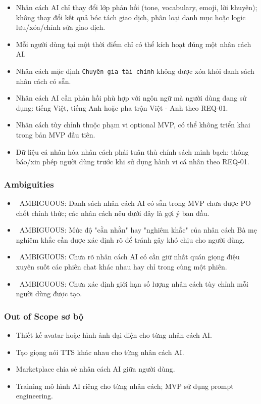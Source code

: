 \begin{itemize}
\item Nhân cách AI chỉ thay đổi lớp phản hồi (tone, vocabulary, emoji, lời khuyên); không thay đổi kết quả bóc tách giao dịch, phân loại danh mục hoặc logic lưu/xóa/chỉnh sửa giao dịch.
\item Mỗi người dùng tại một thời điểm chỉ có thể kích hoạt đúng một nhân cách AI.
\item Nhân cách mặc định \texttt{Chuyên gia tài chính} không được xóa khỏi danh sách nhân cách có sẵn.
\item Nhân cách AI cần phản hồi phù hợp với ngôn ngữ mà người dùng đang sử dụng: tiếng Việt, tiếng Anh hoặc pha trộn Việt - Anh theo REQ-01.
\item Nhân cách tùy chỉnh thuộc phạm vi optional MVP, có thể không triển khai trong bản MVP đầu tiên.
\item Dữ liệu cá nhân hóa nhân cách phải tuân thủ chính sách minh bạch: thông báo/xin phép người dùng trước khi sử dụng hành vi cá nhân theo REQ-01.
\end{itemize}
\subsubsection{Ambiguities}

\begin{itemize}
\item \warningicon\  AMBIGUOUS: Danh sách nhân cách AI có sẵn trong MVP chưa được PO chốt chính thức; các nhân cách nêu dưới đây là gợi ý ban đầu.
\item \warningicon\  AMBIGUOUS: Mức độ "cằn nhằn" hay "nghiêm khắc" của nhân cách Bà mẹ nghiêm khắc cần được xác định rõ để tránh gây khó chịu cho người dùng.
\item \warningicon\  AMBIGUOUS: Chưa rõ nhân cách AI có cần giữ nhất quán giọng điệu xuyên suốt các phiên chat khác nhau hay chỉ trong cùng một phiên.
\item \warningicon\  AMBIGUOUS: Chưa xác định giới hạn số lượng nhân cách tùy chỉnh mỗi người dùng được tạo.
\end{itemize}
\subsubsection{Out of Scope sơ bộ}

\begin{itemize}
\item Thiết kế avatar hoặc hình ảnh đại diện cho từng nhân cách AI.
\item Tạo giọng nói TTS khác nhau cho từng nhân cách AI.
\item Marketplace chia sẻ nhân cách AI giữa người dùng.
\item Training mô hình AI riêng cho từng nhân cách; MVP sử dụng prompt engineering.
\end{itemize}
